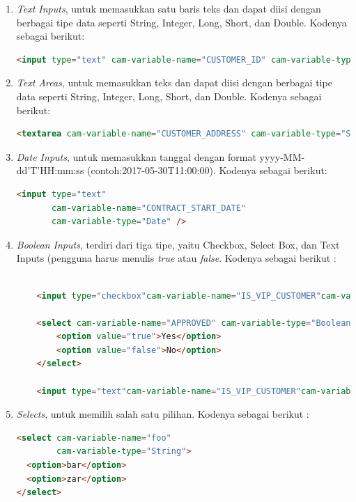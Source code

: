 \begin{enumerate}
	\item \textit{Text Inputs}, untuk memasukkan satu baris teks dan dapat diisi dengan berbagai tipe data seperti String, Integer, Long, Short, dan Double. Kodenya sebagai berikut:
		\begin{lstlisting}[language=html,basicstyle=\tiny,caption=Text Input]
			<input type="text" cam-variable-name="CUSTOMER_ID" cam-variable-type="String" />
		\end{lstlisting}
		
	\item \textit{Text Areas}, untuk memasukkan teks dan dapat diisi dengan berbagai tipe data seperti String, Integer, Long, Short, dan Double. Kodenya sebagai berikut:
		\begin{lstlisting}[language=html,basicstyle=\tiny,caption=Text Areas]
			<textarea cam-variable-name="CUSTOMER_ADDRESS" cam-variable-type="String"></textarea>
		\end{lstlisting}
			
	\item \textit{Date Inputs}, untuk memasukkan tanggal dengan format yyyy-MM-dd'T'HH:mm:ss (contoh:2017-05-30T11:00:00). Kodenya sebagai berikut:
		\begin{lstlisting}[language=html,basicstyle=\tiny,caption=Date Inputs]
			<input type="text"
       cam-variable-name="CONTRACT_START_DATE"
       cam-variable-type="Date" />
		\end{lstlisting}		


	\item \textit{Boolean Inputs}, terdiri dari tiga tipe, yaitu Checkbox, Select Box, dan Text Inputs (pengguna harus menulis \textit{true} atau \textit{false}. Kodenya sebagai berikut :
	\begin{lstlisting}[language=html,basicstyle=\tiny,caption=Boolean Inputs]

	<input type="checkbox"cam-variable-name="IS_VIP_CUSTOMER"cam-variable-type="Boolean" /> 
	
	<select cam-variable-name="APPROVED" cam-variable-type="Boolean">
		<option value="true">Yes</option>
		<option value="false">No</option>
	</select>
	
	<input type="text"cam-variable-name="IS_VIP_CUSTOMER"cam-variable-type="Boolean" />
	\end{lstlisting}
	
	
	\item \textit{Selects}, untuk memilih salah satu pilihan. Kodenya sebagai berikut :
	\begin{lstlisting}[language=html,basicstyle=\tiny,caption=Selects]
	<select cam-variable-name="foo"
        cam-variable-type="String">
  <option>bar</option>
  <option>zar</option>
</select>
\end{lstlisting}


\end{enumerate}
